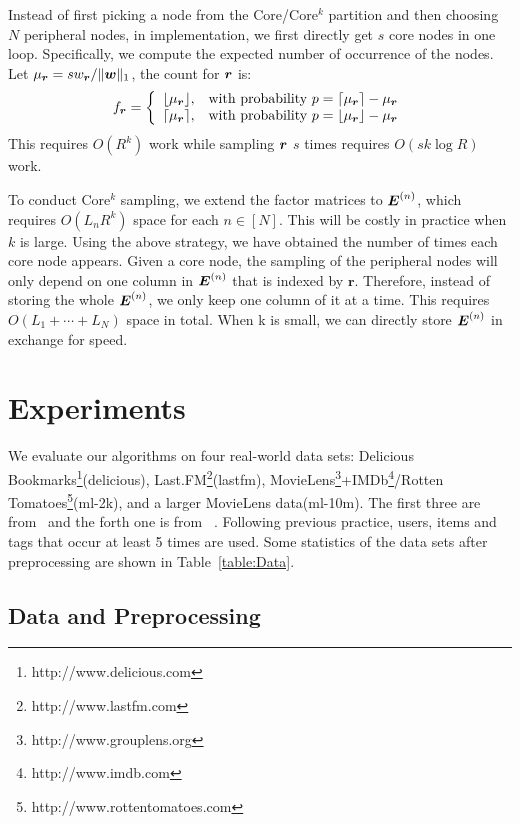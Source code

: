\documentclass[10pt,journal,compsoc]{IEEEtran}
\newcommand{\V}[1]{{\boldsymbol{{\MakeLowercase{#1}}}}}
\newcommand{\M}[1]{{\boldsymbol{{\MakeUppercase{#1}}}}}
\newcommand{\FacMat}[2]{\M{#1}^{(#2)}}
\newcommand{\norm}[2]{\|#1\|_{#2}}
\newcommand{\Table}[1]{Table~\ref{table:#1}}
\begin{document}
Instead of first picking a node from the Core/Core$^k$ partition
and then choosing $N$ peripheral nodes,
in implementation, we first directly get $s$ core nodes in one loop.
Specifically, we compute the expected number of occurrence of the nodes.
Let $\mu_{\V{r}}=sw_\V{r}/\norm{\V{w}}{1}$, the count for $\V{r}$ is:
\begin{equation}f_\V{r}=
\left\{
\begin{array}{ll}
	\lfloor \mu_{\V{r}} \rfloor, & \hbox {with probability $p=\lceil \mu_{\V{r}} \rceil - \mu_{\V{r}}$}  \\
	\lceil \mu_{\V{r}} \rceil,   & \hbox{with probability $p=\lfloor \mu_{\V{r}} \rfloor - \mu_{\V{r}}$}
\end{array}
\right.
\end{equation}
This requires $O(R^k)$ work while sampling $\V{r}$ $s$ times requires $O(sk\log R)$ work.

To conduct Core$^k$ sampling,
we extend the factor matrices to $\FacMat{E}{n}$,
which requires $O(L_nR^k)$ space for each $n\in[N]$.
This will be costly in practice when $k$ is large.
Using the above strategy, we have obtained the number of times each core node appears.
Given a core node, the sampling of the peripheral nodes
will only depend on one column in $\FacMat{E}{n}$ that is indexed by $\boldsymbol{r}$.
Therefore, instead of storing the whole $\FacMat{E}{n}$,
we only keep one column of it at a time.
This requires $O(L_1+\cdots+L_N)$ space in total.
When k is small, we can directly store $\FacMat{E}{n}$ in exchange for speed.
\section{Experiments}
%
%
%
%
%
We evaluate our algorithms on four real-world data sets:
Delicious Bookmarks\footnote{http://www.delicious.com}(delicious),
Last.FM\footnote{http://www.lastfm.com}(lastfm),
MovieLens\footnote{http://www.grouplens.org}+IMDb\footnote{http://www.imdb.com}/Rotten Tomatoes\footnote{http://www.rottentomatoes.com}(ml-2k),
and a larger MovieLens data(ml-10m).
The first three are from~\cite{Cantador:RecSys2011} and the forth one is from ~\cite{Harper2015}.
Following previous practice, users, items and tags that occur at least 5 times are used.
Some statistics of the data sets after preprocessing are shown in \Table{Data}.


\subsection{Data and Preprocessing}
\end{document}
